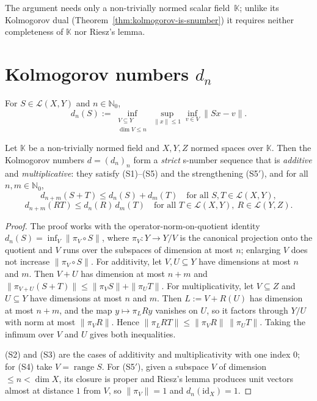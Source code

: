 The argument needs only a non-trivially normed scalar field~$\mathbb{K}$;
unlike its Kolmogorov dual (Theorem~\ref{thm:kolmogorov-is-snumber}) it
requires neither completeness of $\mathbb{K}$ nor Riesz's lemma.

\section{Kolmogorov numbers $d_n$}
\label{sec:kol}

\begin{definition}
\label{def:kolmogorov-number}
\leanok
For $S \in \mathcal{L}(X, Y)$ and $n \in \mathbb{N}_0$,
\[
d_n(S) := \inf_{\substack{V \subseteq Y \\ \dim V \le n}}
            \sup_{\|x\| \le 1} \inf_{v \in V} \|Sx - v\|.
\]
\end{definition}

\begin{theorem}
\label{thm:kolmogorov-is-snumber}
\leanok
{}
Let $\mathbb{K}$ be a non-trivially normed field and $X, Y, Z$ normed spaces
over $\mathbb{K}$. Then the Kolmogorov numbers $d = (d_n)_n$ form a
\emph{strict} s-number sequence that is \emph{additive} and
\emph{multiplicative}: they satisfy (S1)--(S5) and the strengthening
(S5$'$), and for all $n, m \in \mathbb{N}_0$,
\[
  d_{n+m}(S + T) \le d_n(S) + d_m(T)
  \quad \text{for all } S, T \in \mathcal{L}(X, Y),
\]
\[
  d_{n+m}(R T) \le d_n(R) \, d_m(T)
  \quad \text{for all } T \in \mathcal{L}(X, Y), \ R \in \mathcal{L}(Y, Z).
\]
\end{theorem}
\begin{proof}
\leanok
The proof works with the operator-norm-on-quotient identity
$d_n(S) = \inf_V \|\pi_V \circ S\|$, where $\pi_V : Y \to Y/V$ is the
canonical projection onto the quotient and $V$ runs over the subspaces of
dimension at most $n$; enlarging $V$ does not increase
$\|\pi_V \circ S\|$. For additivity, let $V, U \subseteq Y$ have dimensions
at most $n$ and $m$. Then $V + U$ has dimension at most $n + m$ and
$\|\pi_{V+U} (S + T)\| \le \|\pi_V S\| + \|\pi_U T\|$. For multiplicativity,
let $V \subseteq Z$ and $U \subseteq Y$ have dimensions at most $n$ and $m$.
Then $L := V + R(U)$ has dimension at most $n + m$, and the map
$y \mapsto \pi_L R y$ vanishes on $U$, so it factors through $Y/U$ with norm
at most $\|\pi_V R\|$. Hence $\|\pi_L R T\| \le \|\pi_V R\| \, \|\pi_U T\|$.
Taking the infimum over $V$ and $U$ gives both inequalities.

(S2) and (S3) are the cases of additivity and multiplicativity with one
index $0$; for (S4) take $V = \operatorname{range} S$. For (S5$'$), given a
subspace $V$ of dimension $\le n < \dim X$, its closure is proper and
Riesz's lemma produces unit vectors almost at distance $1$ from $V$, so
$\|\pi_V\| = 1$ and $d_n(\mathrm{id}_X) = 1$.
\end{proof}

